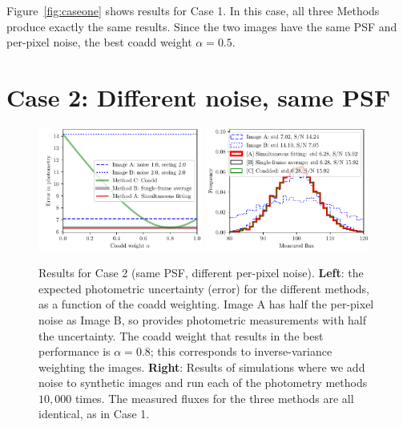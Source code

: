 \documentclass[letter,11pt]{article}
\begin{document}
Figure~\ref{fig:caseone} shows results for Case 1.  In this case, all
three Methods produce exactly the same results.  Since the two images
have the same PSF and per-pixel noise, the best coadd weight $\alpha =
0.5$.

\newpage

\section*{Case 2: Different noise, same PSF}

\begin{figure}[b!]
  \begin{center}
    \includegraphics[width=0.48\textwidth]{coadd-02}
    \includegraphics[width=0.48\textwidth]{coadd-03}
  \end{center}
  \caption{Results for Case 2 (same PSF, different per-pixel noise).
    \textbf{Left}: the expected photometric
    uncertainty (error) for the different methods, as a function of
    the coadd weighting.  Image A has half the per-pixel noise as Image B,
    so provides photometric measurements with half the uncertainty.
    The coadd weight that results in the best performance is $\alpha = 0.8$;
    this corresponds to inverse-variance weighting the images.
    \newline \textbf{Right}: Results of simulations where we
    add noise to synthetic images and run each of the
    photometry methods $10,000$ times.  The measured fluxes for
    the three methods are all identical, as in Case 1.
    \label{fig:casetwo}}
\end{figure}
\end{document}
